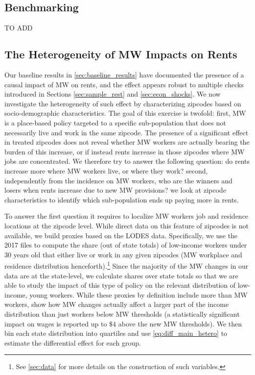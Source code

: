 \subsection{Benchmarking}\label{sec:benchmark}
TO ADD


\subsection{The Heterogeneity of MW Impacts on Rents}\label{sec:heter}

Our baseline results in \autoref{sec:baseline_results} have documented the presence of a causal 
impact of MW on rents, and the effect appears robust to multiple checks introduced in Sections 
\ref{sec:sample_rest} and \ref{sec:econ_shocks}. We now investigate the heterogeneity of such effect 
by characterizing zipcodes based on socio-demographic characteristics. The goal of this exercise is 
twofold: first, MW is a place-based policy targeted to a specific sub-population that does not 
necessarily live and work in the same zipcode. The presence of a significant effect in treated 
zipcodes does not reveal whether MW workers are actually bearing the burden of this increase, or if 
instead rents increase in those zipcodes where MW jobs are concentrated. We therefore try to answer 
the following question: do rents increase more where MW workers live, or where they work? second, 
independently from the incidence on MW workers, who are the winners and losers when rents increase 
due to new MW provisions? we look at zipcode characteristics to identify which sub-population ends 
up paying more in rents.

To answer the first question it requires to localize MW workers job and residence locations at the 
zipcode level. While direct data on this feature of zipcodes is not available, we build proxies 
based on the LODES data. Specifically, we use the 2017 files to compute the share (out of state 
totals) of low-income workers under 30 years old that either live or work in any given zipcodes (MW 
workplace and residence distribution henceforth).\footnote{See \autoref{sec:data} for more details 
	on the construction of such variables.} 
Since the majority of the MW changes in our data are at the state-level, we calculate shares over 
state totals so that we are able to study the impact of this type of policy on the relevant 
distribution of low-income, young workers. While these proxies by definition include more than MW 
workers, \cite{dube2016minimum} show how MW changes actually affect a larger part of the income 
distribution than just workers below MW thresholds (a statistically significant impact on wages is 
reported up to $\$4$ above the new MW thresholds). We then bin each state distribution into quartiles 
and use \autoref{eq:diff_main_hetero} to estimate the differential effect for each group.

